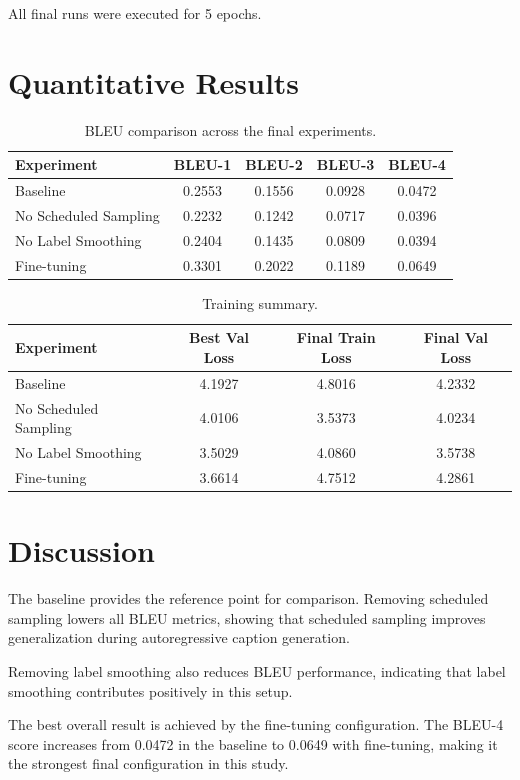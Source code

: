 \documentclass[11pt,a4paper]{article}
\begin{document}
All final runs were executed for 5 epochs.

\section{Quantitative Results}

\begin{table}[H]
\centering
\caption{BLEU comparison across the final experiments.}
\begin{tabular}{lcccc}
\toprule
Experiment & BLEU-1 & BLEU-2 & BLEU-3 & BLEU-4 \\
\midrule
Baseline & 0.2553 & 0.1556 & 0.0928 & 0.0472 \\
No Scheduled Sampling & 0.2232 & 0.1242 & 0.0717 & 0.0396 \\
No Label Smoothing & 0.2404 & 0.1435 & 0.0809 & 0.0394 \\
Fine-tuning & 0.3301 & 0.2022 & 0.1189 & 0.0649 \\
\bottomrule
\end{tabular}
\end{table}

\begin{table}[H]
\centering
\caption{Training summary.}
\begin{tabular}{lccc}
\toprule
Experiment & Best Val Loss & Final Train Loss & Final Val Loss \\
\midrule
Baseline & 4.1927 & 4.8016 & 4.2332 \\
No Scheduled Sampling & 4.0106 & 3.5373 & 4.0234 \\
No Label Smoothing & 3.5029 & 4.0860 & 3.5738 \\
Fine-tuning & 3.6614 & 4.7512 & 4.2861 \\
\bottomrule
\end{tabular}
\end{table}

\section{Discussion}

The baseline provides the reference point for comparison. Removing scheduled sampling lowers all BLEU metrics, showing that scheduled sampling improves generalization during autoregressive caption generation.

Removing label smoothing also reduces BLEU performance, indicating that label smoothing contributes positively in this setup.

The best overall result is achieved by the fine-tuning configuration. The BLEU-4 score increases from 0.0472 in the baseline to 0.0649 with fine-tuning, making it the strongest final configuration in this study.
\end{document}

